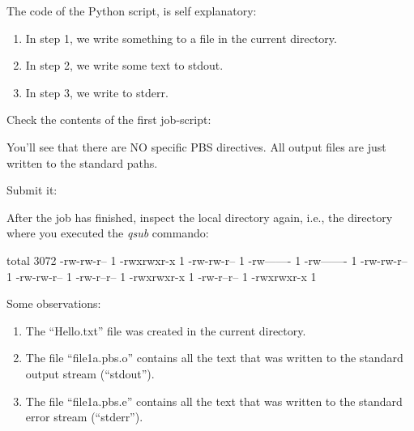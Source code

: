 The code of the Python script, is self explanatory:
\begin{enumerate}
\item  In step 1, we write something to a file in the current directory.
\item  In step 2, we write some text to stdout.
\item  In step 3, we write to stderr.
\end{enumerate}

Check the contents of the first job-script:


You'll see that there are NO specific PBS directives.  All output files are
just written to the standard paths.

Submit it:
\begin{prompt}
\end{prompt}

After the job has finished, inspect the local directory again, i.e., the
directory where you executed the \emph{qsub} commando:

\begin{prompt}
total 3072
-rw-rw-r-- 1 %
-rwxrwxr-x 1 %
-rw-rw-r-- 1 %
-rw------- 1 %
-rw------- 1 %
-rw-rw-r-- 1 %
-rw-rw-r-- 1 %
-rw-r--r-- 1 %
-rwxrwxr-x 1 %
-rw-r--r-- 1 %
-rwxrwxr-x 1 %
\end{prompt}

Some observations:
\begin{enumerate}
\item The ``Hello.txt'' file was created in the current directory.
\item The file ``file1a.pbs.o\jobnumber'' contains all the text that was written to the standard output stream (``stdout'').
\item The file ``file1a.pbs.e\jobnumber'' contains all the text that was written to the standard error stream (``stderr'').
\end{enumerate}


